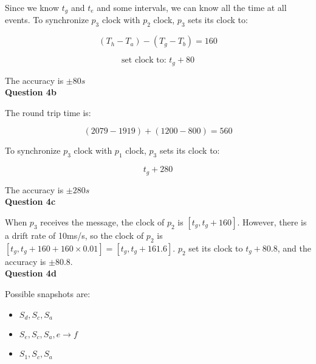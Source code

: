\documentclass[11pt,a4paper]{report}
\begin{document}
\begin{multicols*}{2}
\noindent Since we know $t_g$ and $t_e$ and some intervals, we can know all the time at all events. To synchronize $p_3$ clock with $p_2$ clock, $p_3$ sets its clock to:

$$(T_h - T_a) - (T_g - T_b) = 160$$

$$\text{set clock to: }t_g + 80$$

\noindent The accuracy is $\pm 80s$ \\

\noindent \textbf{Question 4b}

\noindent The round trip time is:

$$(2079 - 1919) + (1200 - 800) = 560$$

\noindent To synchronize $p_3$ clock with $p_1$ clock, $p_3$ sets its clock to:

$$t_g + 280$$

\noindent The accuracy is $\pm 280s$ \\

\noindent \textbf{Question 4c}

\noindent When $p_3$ receives the message, the clock of $p_2$ is $[t_g, t_g + 160]$. However, there is a drift rate of 10ms/s, so the clock of $p_2$ is $[t_g, t_g + 160 + 160 \times 0.01] = [t_g, t_g + 161.6]$. $p_2$ set its clock to $t_g + 80.8$, and the accuracy is $\pm 80.8$.\\

\noindent \textbf{Question 4d}

\noindent Possible snapshots are:

\begin{itemize}
  \item $S_d, S_c, S_a$
  \item $S_e, S_c, S_a, e \rightarrow f$
  \item $S_1, S_c, S_a$
\end{itemize}

\end{multicols*}
\end{document}
